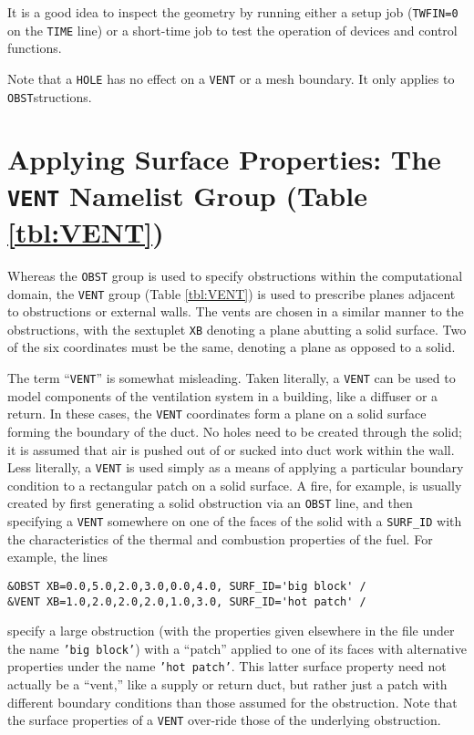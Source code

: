 \documentclass[11pt]{book}
\newcommand{\ct}{\tt\small}
\begin{document}
It is a good idea to inspect the geometry by running either a setup job
({\ct TWFIN=0} on the {\ct TIME} line) or a short-time job to test the operation of devices and control functions.

\begin{warning}
\noindent
Note that a {\ct HOLE} has no effect on a {\ct VENT} or a mesh boundary. It only applies to {\ct OBST}structions.
\end{warning}



\section{Applying Surface Properties: The \texorpdfstring{{\tt VENT}}{VENT} Namelist Group (Table \ref{tbl:VENT})}
\label{info:VENT} 

Whereas the {\ct OBST} group is used to specify obstructions within the
computational domain, the {\ct VENT} group (Table \ref{tbl:VENT}) is used to prescribe planes
adjacent to obstructions or external walls. The vents are chosen in a
similar manner to the obstructions, with the sextuplet {\ct XB}
denoting a plane abutting a solid surface. Two of the six coordinates must
be the same, denoting a plane as opposed to a solid.

The term ``{\ct VENT}'' is somewhat misleading. Taken literally, a
{\ct VENT} can be used to model components of the ventilation system in
a building, like a diffuser or a return.
In these cases, the {\ct VENT} coordinates form a plane on a
solid surface forming the boundary of the duct.
No holes need to be created through the solid; it is
assumed that air is pushed out of or sucked into duct work within the
wall. Less literally, a {\ct VENT} is used simply as a means of applying
a particular boundary condition to a rectangular patch on a solid surface.
A fire, for example, is usually created by first generating a solid
obstruction via an {\ct OBST} line, and then specifying a {\ct VENT}
somewhere on one of the faces of the solid with a {\ct SURF\_ID}
with the characteristics of the thermal and combustion properties of the fuel.
For example, the lines

\footnotesize
\begin{verbatim}
&OBST XB=0.0,5.0,2.0,3.0,0.0,4.0, SURF_ID='big block' /
&VENT XB=1.0,2.0,2.0,2.0,1.0,3.0, SURF_ID='hot patch' /
\end{verbatim} \normalsize

\noindent
specify a large obstruction (with the properties given elsewhere in the file under the name {\ct 'big block'}) with
a ``patch'' applied to one of its faces with alternative properties under the name {\ct 'hot patch'}. This latter
surface property need not actually be a ``vent,'' like a supply or return duct, but rather just a patch with different boundary
conditions than those assumed for the obstruction. Note that the surface properties of a {\ct VENT} over-ride those of the
underlying obstruction.
\end{document}
